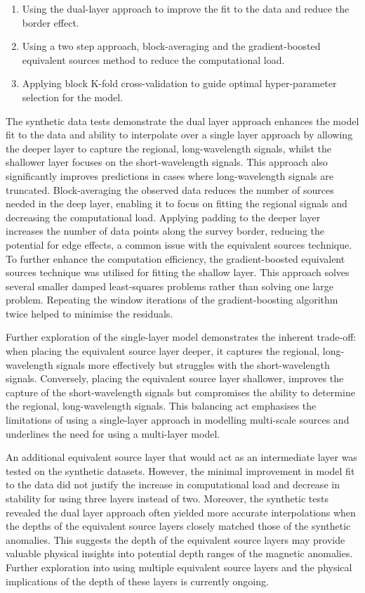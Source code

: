 \begin{enumerate}
    \item Using the dual-layer approach to improve the fit to the data and reduce the border effect.
    \item Using a two step approach, block-averaging and the gradient-boosted equivalent sources method to reduce the computational load.
    \item Applying block K-fold cross-validation to guide optimal hyper-parameter selection for the model.
\end{enumerate}

The synthetic data tests demonstrate the dual layer approach enhances the model fit to the data and ability to interpolate over a single layer approach by allowing the deeper layer to capture the regional, long-wavelength signals, whilst the shallower layer focuses on the short-wavelength signals. This approach also significantly improves predictions in cases where long-wavelength signals are truncated. Block-averaging the observed data reduces the number of sources needed in the deep layer, enabling it to focus on fitting the regional signals and decreasing the computational load. Applying padding to the deeper layer increases the number of data points along the survey border, reducing the potential for edge effects, a common issue with the equivalent sources technique. To further enhance the computation efficiency, the gradient-boosted equivalent sources technique was utilised for fitting the shallow layer. This approach solves several smaller damped least-squares problems rather than solving one large problem. Repeating the window iterations of the gradient-boosting algorithm twice helped to minimise the residuals.

Further exploration of the single-layer model demonstrates the inherent trade-off: when placing the equivalent source layer deeper, it captures the regional, long-wavelength signals more effectively but struggles with the short-wavelength signals. Conversely, placing the equivalent source layer shallower, improves the capture of the short-wavelength signals but compromises the ability to determine the regional, long-wavelength signals. This balancing act emphasises the limitations of using a single-layer approach in modelling multi-scale sources and underlines the need for using a multi-layer model.

An additional equivalent source layer that would act as an intermediate layer was tested on the synthetic datasets. However, the minimal improvement in model fit to the data did not justify the increase in computational load and decrease in stability for using three layers instead of two. Moreover, the synthetic tests revealed the dual layer approach often yielded more accurate interpolations when the depths of the equivalent source layers closely matched those of the synthetic anomalies. This suggests the depth of the equivalent source layers may provide valuable physical insights into potential depth ranges of the magnetic anomalies. Further exploration into using multiple equivalent source layers and the physical implications of the depth of these layers is currently ongoing.

